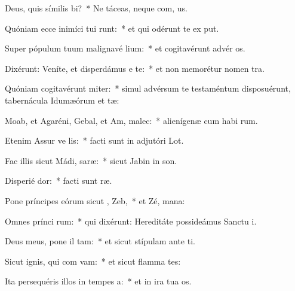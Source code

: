 \item Deus, quis símilis  bi?~* Ne táceas, neque com, us.
\item Quóniam ecce inimíci tui runt:~* et qui odérunt te ex put.
\item Super pópulum tuum malignavé lium:~* et cogitavérunt advér  os.
\item Dixérunt: Veníte, et disperdámus e  te:~* et non memorétur nomen  tra.
\item Quóniam cogitavérunt miter:~* simul advérsum te testaméntum disposuérunt, tabernácula Idumæórum et tæ:
\item Moab, et Agaréni, Gebal, et Am,  malec:~* alienígenæ cum habi rum.
\item Etenim Assur ve  lis:~* facti sunt in adjutóri  Lot.
\item Fac illis sicut Mádi,  saræ:~* sicut Jabin in  son.
\item Disperié  dor:~* facti sunt   ræ.
\item Pone príncipes eórum sicut ,  Zeb,~* et Zé,  mana:
\item Omnes prínci rum:~* qui dixérunt: Hereditáte possideámus Sanctu i.
\item Deus meus, pone il  tam:~* et sicut stípulam ante  ti.
\item Sicut ignis, qui com vam:~* et sicut flamma  tes:
\item Ita persequéris illos in tempes a:~* et in ira tua  os.
